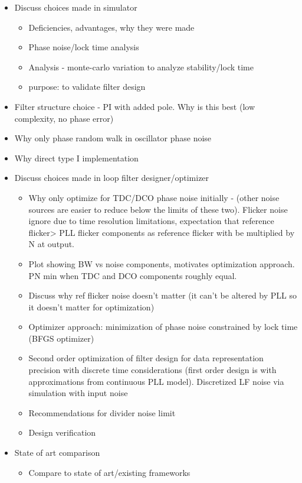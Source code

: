 \begin{itemize}
	\item Discuss choices made in simulator
	\begin{itemize}
		\item Deficiencies, advantages, why they were made
		\item Phase noise/lock time analysis
		\item Analysis - monte-carlo variation to analyze stability/lock time
		\item purpose: to validate filter design
	\end{itemize}
	\item Filter structure choice - PI with added pole. Why is this best (low complexity, no phase error)
	\item Why only phase random walk in oscillator phase noise
	\item Why direct type I implementation
	\item Discuss choices made in loop filter designer/optimizer
	\begin{itemize}
		\item Why only optimize for TDC/DCO phase noise initially - (other noise sources are easier to reduce below the limits of these two). Flicker noise ignore due to time resolution limitations, expectation that reference flicker> PLL flicker components as reference flicker with be multiplied by N at output.
		\item Plot showing BW vs noise components, motivates optimization approach. PN min when TDC and DCO components roughly equal.
		\item Discuss why ref flicker noise doesn't matter (it can't be altered by PLL so it doesn't matter for optimization)
		\item Optimizer approach: minimization of phase noise constrained by lock time (BFGS optimizer)
		\item Second order optimization of filter design for data representation precision with discrete time considerations (first order design is with approximations from continuous PLL model). Discretized LF noise via simulation with input noise
		\item Recommendations for divider noise limit
		\item Design verification
	\end{itemize}
	\item State of art comparison
	\begin{itemize}
		\item Compare to state of art/existing frameworks

\end{itemize}
\end{itemize}
